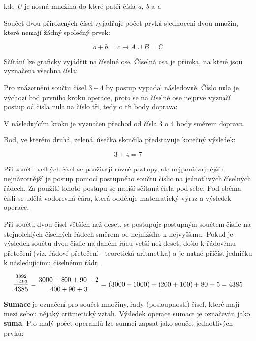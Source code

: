 kde {\it U} je nosná množina do které patří čísla {\it a}, {\it b} a {\it c}.

Součet dvou přirozených čísel vyjadřuje počet prvků sjednocení dvou množin, které nemají žádný společný prvek:

$$ a + b = c \rightarrow A \cup B = C $$


Sčítání lze graficky vyjádřit na číselné ose. Číselná osa je přímka, na které jsou vyznačena všechna čísla:

\vskip 4mm
\centerline{}
\vskip 4mm

Pro znázornění součtu čísel $3 + 4$ by postup vypadal následovně. Číslo nula je výchozí bod prvního kroku operace, proto se na číselné ose nejprve vyznačí postup od čísla nula na číslo tři, tedy o tři body doprava:

\vskip 4mm
\centerline{}
\vskip 4mm

V následujícím kroku je vyznačen přechod od čísla 3 o 4 body směrem doprava.

\vskip 4mm
\centerline{}
\vskip 4mm

Bod, ve kterém druhá, zelená, úsečka skončila představuje konečný výsledek:

$$ 3+4=7 $$


Při součtu velkých čísel se používají různé postupy, ale nejpoužívajnější a nejnázornější je postup pomocí postupného součtu číslic na jednotlivých číselných řádech. Za použití tohoto postupu se napíší sčítaná čísla pod sebe. Pod oběma čísli se udělá vodorovná čára, která odděluje matematický výraz a výsledek operace.

Při součtu dvou čísel větších než deset, se postupuje postupným součtem číslic na stejnolehlých číselných řádech směrem od nejnižšího k nejvyššímu. Pokud je výsledek součtu dvou číslic na daném řádu vetší než deset, došlo k řádovému přetečení (viz. řádové přetečení - teoretická aritmetika) a je nutné přičíst jedničku k následujícímu číselnému řádu.

$$ {{3892 \atop +493} \over 4385} = {{3000 + 800 + 90 + 2}\atop{400 + 90 + 3 }} = (3000+1000)+(200+100)+80+5 = 4385$$


{\bf Sumace} je označení pro součet množiny, řady  (posloupnosti) čísel, které mají mezi sebou nějaký aritmetický vztah. Výsledek operace sumace je označován jako {\bf suma}. Pro malý počet operandů lze sumaci zapsat jako součet jednotlivých prvků:

